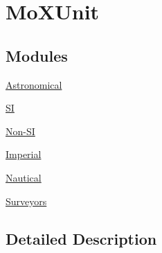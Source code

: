 \hypertarget{group___e_g_x_math-_conversions-_length_conversions-_non-_s_i-_mo_x_unit}{}\section{Mo\+X\+Unit}
\label{group___e_g_x_math-_conversions-_length_conversions-_non-_s_i-_mo_x_unit}
\subsection*{Modules}
\begin{DoxyCompactItemize}
\item 
\mbox{\hyperlink{group___e_g_x_math-_conversions-_length_conversions-_non-_s_i-_mo_x_unit-_astronomical}{Astronomical}}
\item 
\mbox{\hyperlink{group___e_g_x_math-_conversions-_length_conversions-_non-_s_i-_mo_x_unit-_s_i}{SI}}
\item 
\mbox{\hyperlink{group___e_g_x_math-_conversions-_length_conversions-_non-_s_i-_mo_x_unit-_non-_s_i}{Non-\/\+SI}}
\item 
\mbox{\hyperlink{group___e_g_x_math-_conversions-_length_conversions-_non-_s_i-_mo_x_unit-_imperial}{Imperial}}
\item 
\mbox{\hyperlink{group___e_g_x_math-_conversions-_length_conversions-_non-_s_i-_mo_x_unit-_nautical}{Nautical}}
\item 
\mbox{\hyperlink{group___e_g_x_math-_conversions-_length_conversions-_non-_s_i-_mo_x_unit-_surveyors}{Surveyors}}
\end{DoxyCompactItemize}


\subsection{Detailed Description}
